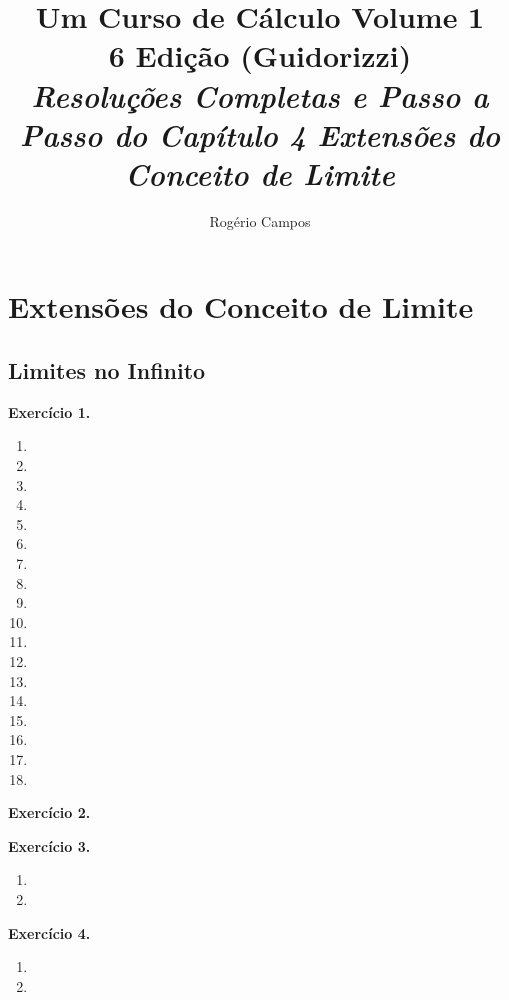 \documentclass[12pt,a4paper]{article}
\title{
    \Huge \textbf{Um Curso de Cálculo Volume 1} \\
    \vspace{0.3cm}
    \Large 6\textordfeminine{} Edição (Guidorizzi) \\
    \vspace{0.5cm}
    \large \textit{Resoluções Completas e Passo a Passo do Capítulo 4 Extensões do Conceito de Limite}
}
\author{Rogério Campos}
\begin{document}
\maketitle
\newpage

\tableofcontents
\newpage

\setcounter{section}{3}
\setcounter{subsection}{0}

\section{Extensões do Conceito de Limite}
\subsection{Limites no Infinito}
\vspace{0.5cm}
\noindent\textbf{Exercício 1.}
\begin{enumerate}
    \renewcommand{\theenumi}{\alph{enumi}}
    \renewcommand{\labelenumi}{\theenumi)}
    \item 
    \item 
    \item 
    \item 
    \item 
    \item 
    \item 
    \item 
    \item 
    \item 
    \item 
    \item 
    \item 
    \item 
    \item 
    \item 
    \item 
    \item 
\end{enumerate}

\vspace{0.5cm}
\noindent\textbf{Exercício 2.}

\vspace{0.5cm}
\noindent\textbf{Exercício 3.}
\begin{enumerate}
    \renewcommand{\theenumi}{\alph{enumi}}
    \renewcommand{\labelenumi}{\theenumi)}
    \item 
    \item 
\end{enumerate}

\vspace{0.5cm}
\noindent\textbf{Exercício 4.}
\begin{enumerate}
    \renewcommand{\theenumi}{\alph{enumi}}
    \renewcommand{\labelenumi}{\theenumi)}
    \item 
    \item 
\end{enumerate}
\end{document}
